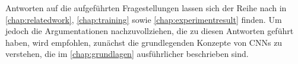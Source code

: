 Antworten auf die aufgeführten Fragestellungen lassen sich der Reihe nach in \autoref{chap:relatedwork}, \autoref{chap:training} sowie \autoref{chap:experimentresult} finden. Um jedoch die Argumentationen nachzuvollziehen, die zu diesen Antworten geführt haben, wird empfohlen, zunächst die grundlegenden Konzepte von CNNs zu verstehen, die im \autoref{chap:grundlagen} ausführlicher beschrieben sind.